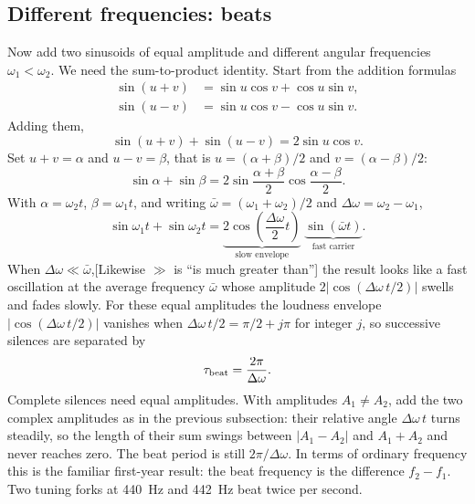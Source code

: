 \subsection{Different frequencies: beats}

Now add two sinusoids of equal amplitude and different angular frequencies $\omega_1<\omega_2$. We need the sum-to-product identity. Start from the addition formulas
\begin{align}
\sin(u+v)&=\sin u\cos v+\cos u\sin v,\\
\sin(u-v)&=\sin u\cos v-\cos u\sin v .
\end{align}
Adding them,
\begin{equation}
\sin(u+v)+\sin(u-v)=2\sin u\cos v .
\end{equation}
Set $u+v=\alpha$ and $u-v=\beta$, that is $u=(\alpha+\beta)/2$ and $v=(\alpha-\beta)/2$:
\begin{equation}
\sin\alpha+\sin\beta=2\sin\frac{\alpha+\beta}{2}\cos\frac{\alpha-\beta}{2}.
\label{eq:fourier-series-sumprod}
\end{equation}
With $\alpha=\omega_2t$, $\beta=\omega_1t$, and writing $\bar\omega=(\omega_1+\omega_2)/2$ and $\Delta\omega=\omega_2-\omega_1$,
\begin{equation}
\sin\omega_1t+\sin\omega_2t=\underbrace{2\cos\!\left(\frac{\Delta\omega}{2}t\right)}_{\text{slow envelope}}\;\underbrace{\sin(\bar\omega t)}_{\text{fast carrier}} .
\label{eq:fourier-series-beats}
\end{equation}
When $\Delta\omega\ll\bar\omega$,[Likewise $\gg$ is ``is much greater than''] the result looks like a fast oscillation at the average frequency $\bar\omega$ whose amplitude $2|\cos(\Delta\omega\, t/2)|$ swells and fades slowly. For these equal amplitudes the loudness envelope $|\cos(\Delta\omega\, t/2)|$ vanishes when $\Delta\omega\, t/2=\pi/2+j\pi$ for integer $j$, so successive silences are separated by
\begin{equation}
\tau_{\rm beat}=\frac{2\pi}{\Delta\omega}.
\label{eq:fourier-series-beatperiod}
\end{equation}
Complete silences need equal amplitudes. With amplitudes $A_1\neq A_2$, add the two complex amplitudes as in the previous subsection: their relative angle $\Delta\omega\,t$ turns steadily, so the length of their sum swings between $|A_1-A_2|$ and $A_1+A_2$ and never reaches zero. The beat period is still $2\pi/\Delta\omega$. In terms of ordinary frequency this is the familiar first-year result: the beat frequency is the difference $f_2-f_1$. Two tuning forks at 440~Hz and 442~Hz beat twice per second.

